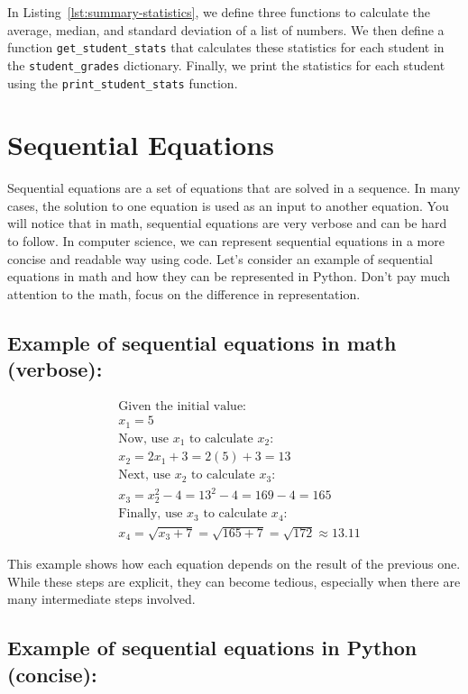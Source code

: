 In Listing~\ref{lst:summary-statistics}, we define three functions to calculate the average, median, and standard deviation of a list of numbers. We then define a function \texttt{get\_student\_stats} that calculates these statistics for each student in the \texttt{student\_grades} dictionary. Finally, we print the statistics for each student using the \texttt{print\_student\_stats} function.

\section{Sequential Equations}

Sequential equations are a set of equations that are solved in a sequence. In many cases, the solution to one equation is used as an input to another equation. You will notice that in math, sequential equations are very verbose and can be hard to follow. In computer science, we can represent sequential equations in a more concise and readable way using code. Let's consider an example of sequential equations in math and how they can be represented in Python. Don't pay much attention to the math, focus on the difference in representation.

\subsection{Example of sequential equations in math (verbose):}

\[
\begin{aligned}
    & \text{Given the initial value:} \\
    & x_1 = 5 \\
    & \text{Now, use } x_1 \text{ to calculate } x_2: \\
    & x_2 = 2x_1 + 3 = 2(5) + 3 = 13 \\
    & \text{Next, use } x_2 \text{ to calculate } x_3: \\
    & x_3 = x_2^2 - 4 = 13^2 - 4 = 169 - 4 = 165 \\
    & \text{Finally, use } x_3 \text{ to calculate } x_4: \\
    & x_4 = \sqrt{x_3 + 7} = \sqrt{165 + 7} = \sqrt{172} \approx 13.11
\end{aligned}
\]

This example shows how each equation depends on the result of the previous one. While these steps are explicit, they can become tedious, especially when there are many intermediate steps involved.

\subsection{Example of sequential equations in Python (concise):}


